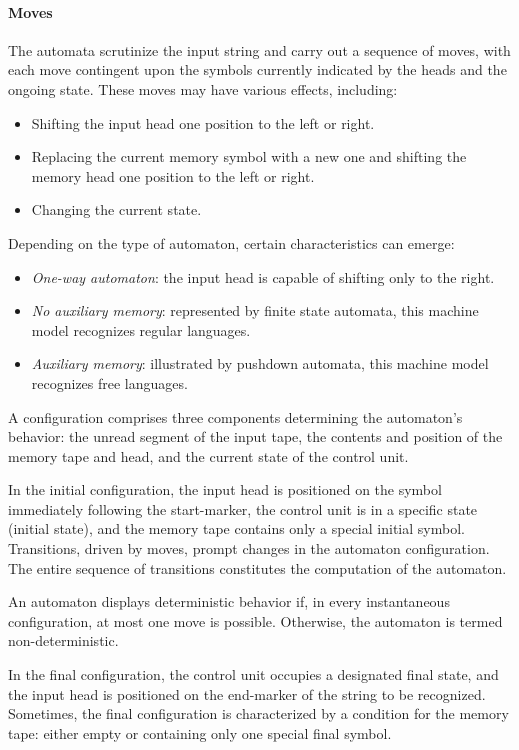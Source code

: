 \paragraph*{Moves}
The automata scrutinize the input string and carry out a sequence of moves, with each move contingent upon the symbols currently indicated by the heads and the ongoing state. 
These moves may have various effects, including:
\begin{itemize}
    \item Shifting the input head one position to the left or right.
    \item Replacing the current memory symbol with a new one and shifting the memory head one position to the left or right.
    \item Changing the current state.
\end{itemize}
Depending on the type of automaton, certain characteristics can emerge:
\begin{itemize}
    \item \textit{One-way automaton}: the input head is capable of shifting only to the right.
    \item \textit{No auxiliary memory}: represented by finite state automata, this machine model recognizes regular languages.
    \item \textit{Auxiliary memory}: illustrated by pushdown automata, this machine model recognizes free languages.
\end{itemize}
\begin{definition}
    A configuration comprises three components determining the automaton's behavior: the unread segment of the input tape, the contents and position of the memory tape and head, and the current state of the control unit.
\end{definition}
In the initial configuration, the input head is positioned on the symbol immediately following the start-marker, the control unit is in a specific state (initial state), and the memory tape contains only a special initial symbol.
Transitions, driven by moves, prompt changes in the automaton configuration. 
The entire sequence of transitions constitutes the computation of the automaton.
\begin{definition}
    An automaton displays deterministic behavior if, in every instantaneous configuration, at most one move is possible. 
    Otherwise, the automaton is termed non-deterministic.
\end{definition}
In the final configuration, the control unit occupies a designated final state, and the input head is positioned on the end-marker of the string to be recognized. 
Sometimes, the final configuration is characterized by a condition for the memory tape: either empty or containing only one special final symbol.

